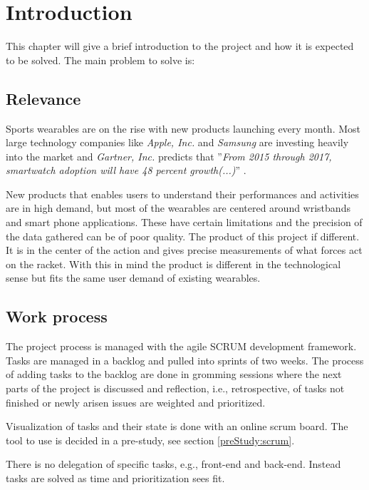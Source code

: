 \chapter{Introduction}
This chapter will give a brief introduction to the project and how it is expected to be solved.
The main problem to solve is:


\section*{Relevance}
Sports wearables are on the rise with new products launching every month. 
Most large technology companies like \textit{Apple, Inc.} and \textit{Samsung} are investing heavily into the market and \textit{Gartner, Inc.} predicts that ''\textit{From 2015 through 2017, smartwatch adoption will have 48 percent growth(...)}'' \citep{introduction:relevance:gartner}.

New products that enables users to understand their performances and activities are in high demand, but most of the wearables are centered around wristbands and smart phone applications. 
These have certain limitations and the precision of the data gathered can be of poor quality.
The product of this project if different. 
It is in the center of the action and gives precise measurements of what forces act on the racket.
With this in mind the product is different in the technological sense but fits the same user demand of existing wearables.

\section*{Work process}
The project process is managed with the agile SCRUM development framework. 
Tasks are managed in a backlog and pulled into sprints of two weeks. 
The process of adding tasks to the backlog are done in gromming sessions where the next parts of the project is discussed and reflection, i.e., retrospective, of tasks not finished or newly arisen issues are weighted and prioritized.

Visualization of tasks and their state is done with an online scrum board. 
The tool to use is decided in a pre-study, see section \ref{preStudy:scrum}.

There is no delegation of specific tasks, e.g., front-end and back-end. 
Instead tasks are solved as time and prioritization sees fit.
